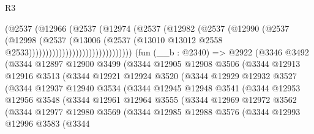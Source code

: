 \begin{lexlean}{R3}
\begin{coremodule}
                                      (@2537
                                        (@12966
                                          (@2537
                                            (@12974
                                              (@2537
                                                (@12982
                                                  (@2537
                                                    (@12990
                                                      (@2537
                                                        (@12998
                                                          (@2537
                                                            (@13006
                                                              (@2537
                                                                (@13010
                                                                  @13012
                                                                  @2558
                                                                  @2533)))))))))))))))))))))))))))))))
    (fun (__b : @2340) =>
    @2922
      (@3346
        @3492
        (@3344
          @12897
          @12900
          @3499
          (@3344
            @12905
            @12908
            @3506
            (@3344
              @12913
              @12916
              @3513
              (@3344
                @12921
                @12924
                @3520
                (@3344
                  @12929
                  @12932
                  @3527
                  (@3344
                    @12937
                    @12940
                    @3534
                    (@3344
                      @12945
                      @12948
                      @3541
                      (@3344
                        @12953
                        @12956
                        @3548
                        (@3344
                          @12961
                          @12964
                          @3555
                          (@3344
                            @12969
                            @12972
                            @3562
                            (@3344
                              @12977
                              @12980
                              @3569
                              (@3344
                                @12985
                                @12988
                                @3576
                                (@3344
                                  @12993
                                  @12996
                                  @3583
                                  (@3344

\end{coremodule}
\end{lexlean}
